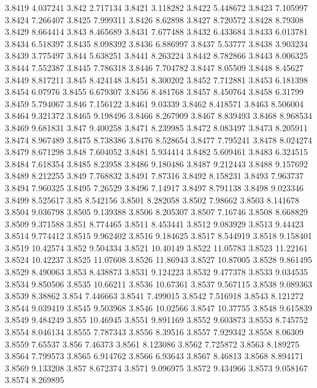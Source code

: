 3.8419  4.037241
3.842  2.717134
3.8421  3.118282
3.8422  5.448672
3.8423  7.105997
3.8424  7.266407
3.8425  7.999311
3.8426  8.62898
3.8427  8.720572
3.8428  8.79308
3.8429  8.664414
3.843  8.465689
3.8431  7.677488
3.8432  6.433684
3.8433  6.013781
3.8434  6.518397
3.8435  8.098392
3.8436  6.886997
3.8437  5.53777
3.8438  3.903234
3.8439  3.775497
3.844  5.638251
3.8441  8.263224
3.8442  8.782866
3.8443  8.006325
3.8444  7.552387
3.8445  7.786318
3.8446  7.704782
3.8447  8.05509
3.8448  8.45627
3.8449  8.817211
3.845  8.424148
3.8451  8.300202
3.8452  7.712881
3.8453  6.181398
3.8454  6.07976
3.8455  6.679307
3.8456  8.481768
3.8457  8.450764
3.8458  6.31799
3.8459  5.794067
3.846  7.156122
3.8461  9.03339
3.8462  8.418571
3.8463  8.506004
3.8464  9.321372
3.8465  9.198496
3.8466  8.267909
3.8467  8.839493
3.8468  8.968534
3.8469  9.681831
3.847  9.400258
3.8471  8.239985
3.8472  8.083497
3.8473  8.205911
3.8474  8.967489
3.8475  8.738386
3.8476  8.528654
3.8477  7.795241
3.8478  8.024274
3.8479  8.671298
3.848  7.604052
3.8481  5.934414
3.8482  5.609461
3.8483  6.324515
3.8484  7.618354
3.8485  8.23958
3.8486  9.180486
3.8487  9.212443
3.8488  9.157692
3.8489  8.212255
3.849  7.768832
3.8491  7.87316
3.8492  8.158231
3.8493  7.963737
3.8494  7.960325
3.8495  7.26529
3.8496  7.14917
3.8497  8.791138
3.8498  9.023346
3.8499  8.525617
3.85  8.542156
3.8501  8.282058
3.8502  7.98662
3.8503  8.141678
3.8504  9.036798
3.8505  9.139388
3.8506  8.205307
3.8507  7.16746
3.8508  8.668829
3.8509  9.371588
3.851  8.774465
3.8511  8.453441
3.8512  9.083929
3.8513  9.44423
3.8514  9.774412
3.8515  9.962402
3.8516  9.184625
3.8517  8.544919
3.8518  9.158401
3.8519  10.42574
3.852  9.504334
3.8521  10.40149
3.8522  11.05783
3.8523  11.22161
3.8524  10.42237
3.8525  11.07608
3.8526  11.86943
3.8527  10.87005
3.8528  9.861495
3.8529  8.490063
3.853  8.438873
3.8531  9.124223
3.8532  9.477378
3.8533  9.034535
3.8534  9.850506
3.8535  10.66211
3.8536  10.67361
3.8537  9.567115
3.8538  9.089363
3.8539  8.38862
3.854  7.446663
3.8541  7.499015
3.8542  7.516918
3.8543  8.121272
3.8544  9.039419
3.8545  9.503968
3.8546  10.02566
3.8547  10.37755
3.8548  9.615839
3.8549  9.484249
3.855  10.46945
3.8551  9.891169
3.8552  9.603873
3.8553  8.745752
3.8554  8.046134
3.8555  7.787343
3.8556  8.39516
3.8557  7.929342
3.8558  8.06309
3.8559  7.65537
3.856  7.46373
3.8561  8.123086
3.8562  7.725872
3.8563  8.189275
3.8564  7.799573
3.8565  6.914762
3.8566  6.93643
3.8567  8.46813
3.8568  8.894171
3.8569  9.133208
3.857  8.672374
3.8571  9.096975
3.8572  9.434966
3.8573  9.058167
3.8574  8.269895
